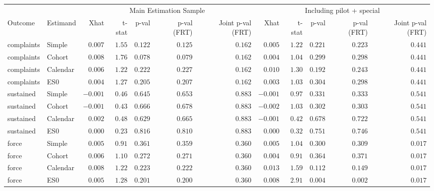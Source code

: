 \begin{longtable}{llrrrrrrrrrr}
\toprule
 &  & \multicolumn{5}{c}{Main Estimation Sample} & \multicolumn{5}{c}{Including pilot + special} \\ 
\cmidrule(lr){3-7} \cmidrule(lr){8-12}
Outcome & Estimand & Xhat & t-stat & p-val & p-val (FRT) & Joint p-val 
(FRT) & Xhat & t-stat & p-val & p-val (FRT) & Joint p-val 
(FRT) \\ 
\midrule
complaints & Simple & $0.007$ & $1.55$ & $0.122$ & $0.125$ & $0.162$ & $0.005$ & $1.22$ & $0.221$ & $0.223$ & $0.441$ \\ 
complaints & Cohort & $0.008$ & $1.76$ & $0.078$ & $0.079$ & $0.162$ & $0.004$ & $1.04$ & $0.299$ & $0.298$ & $0.441$ \\ 
complaints & Calendar & $0.006$ & $1.22$ & $0.222$ & $0.227$ & $0.162$ & $0.010$ & $1.30$ & $0.192$ & $0.243$ & $0.441$ \\ 
complaints & ES0 & $0.004$ & $1.27$ & $0.205$ & $0.207$ & $0.162$ & $0.003$ & $1.03$ & $0.304$ & $0.298$ & $0.441$ \\ 
sustained & Simple & $-0.001$ & $0.46$ & $0.645$ & $0.653$ & $0.883$ & $-0.001$ & $0.97$ & $0.331$ & $0.333$ & $0.541$ \\ 
sustained & Cohort & $-0.001$ & $0.43$ & $0.666$ & $0.678$ & $0.883$ & $-0.002$ & $1.03$ & $0.302$ & $0.303$ & $0.541$ \\ 
sustained & Calendar & $0.002$ & $0.48$ & $0.629$ & $0.665$ & $0.883$ & $-0.001$ & $0.42$ & $0.678$ & $0.722$ & $0.541$ \\ 
sustained & ES0 & $0.000$ & $0.23$ & $0.816$ & $0.810$ & $0.883$ & $0.000$ & $0.32$ & $0.751$ & $0.746$ & $0.541$ \\ 
force & Simple & $0.005$ & $0.91$ & $0.361$ & $0.359$ & $0.360$ & $0.005$ & $1.04$ & $0.300$ & $0.309$ & $0.017$ \\ 
force & Cohort & $0.006$ & $1.10$ & $0.272$ & $0.271$ & $0.360$ & $0.004$ & $0.91$ & $0.364$ & $0.371$ & $0.017$ \\ 
force & Calendar & $0.008$ & $1.22$ & $0.223$ & $0.222$ & $0.360$ & $0.013$ & $1.59$ & $0.112$ & $0.149$ & $0.017$ \\ 
force & ES0 & $0.005$ & $1.28$ & $0.201$ & $0.200$ & $0.360$ & $0.008$ & $2.91$ & $0.004$ & $0.002$ & $0.017$ \\ 
\bottomrule
\end{longtable}

